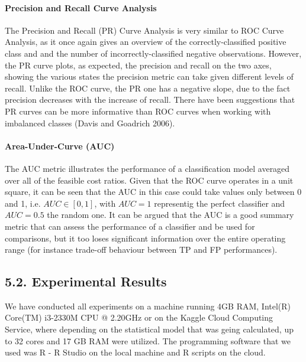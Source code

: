 \documentclass[12pt,]{article}
\let\oldparagraph\paragraph
\renewcommand{\paragraph}[1]{\oldparagraph{#1}\mbox{}}
\begin{document}
\hypertarget{precision-and-recall-curve-analysis}{%
\paragraph{Precision and Recall Curve
Analysis}\label{precision-and-recall-curve-analysis}}

The Precision and Recall (PR) Curve Analysis is very similar to ROC
Curve Analysis, as it once again gives an overview of the
correctly-classified positive class and and the number of
incorrectly-classified negative observations. However, the PR curve
plots, as expected, the precision and recall on the two axes, showing
the various states the precision metric can take given different levels
of recall. Unlike the ROC curve, the PR one has a negative slope, due to
the fact precision decreases with the increase of recall. There have
been suggestions that PR curves can be more informative than ROC curves
when working with imbalanced classes (Davis and Goadrich 2006).

\hypertarget{area-under-curve-auc}{%
\paragraph{Area-Under-Curve (AUC)}\label{area-under-curve-auc}}

The AUC metric illustrates the performance of a classification model
averaged over all of the feasible cost ratios. Given that the ROC curve
operates in a unit square, it can be seen that the AUC in this case
could take values only between 0 and 1, i.e. \(AUC \in [0,1]\), with
\(AUC=1\) representig the perfect classifier and \(AUC=0.5\) the random
one. It can be argued that the AUC is a good summary metric that can
assess the performance of a classifier and be used for comparisons, but
it too loses significant information over the entire operating range
(for instance trade-off behaviour between TP and FP performances).

\hypertarget{experimental-results}{%
\subsection{5.2. Experimental Results}\label{experimental-results}}

We have conducted all experiments on a machine running 4GB RAM, Intel(R)
Core(TM) i3-2330M CPU @ 2.20GHz or on the Kaggle Cloud Computing
Service, where depending on the statistical model that was geing
calculated, up to 32 cores and 17 GB RAM were utilized. The programming
software that we used was R - R Studio on the local machine and R
scripts on the cloud.
\end{document}
